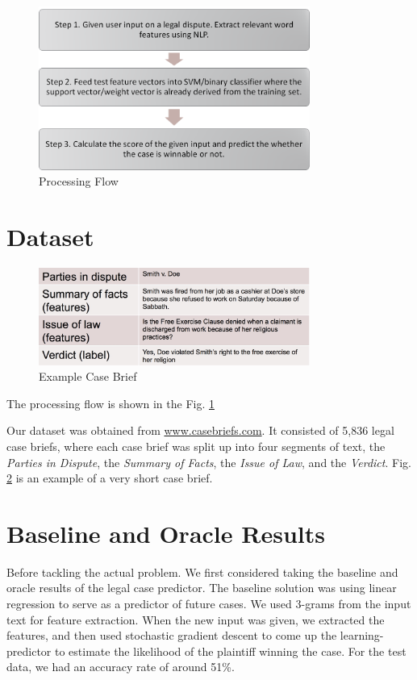 \documentclass[journal]{IEEEtran}
\begin{document}
\begin{figure}
    \centering
    \includegraphics[width=3.5in]{flow.png}
    \caption{Processing Flow}
    \label{fig:ProcessingFlow}
\end{figure}

\section{Dataset}

\begin{figure}
    \centering
    \includegraphics[width=3.5in]{exampleCaseBrief.jpg}
    \caption{Example Case Brief}
    \label{fig:ExampleCaseBrief}
\end{figure}

The processing flow is shown in the Fig. \ref{fig:ProcessingFlow}

Our dataset was obtained from \url{www.casebriefs.com}. It consisted of 5,836 legal case briefs, where each case brief was split up into four segments of text, the \textit{Parties in Dispute}, the \textit{Summary of Facts}, the \textit{Issue of Law}, and the \textit{Verdict}. Fig. \ref{fig:ExampleCaseBrief} is  an example of a very short case brief.

\section{Baseline and Oracle Results}
Before tackling the actual problem. We first considered taking the baseline and oracle results of the legal case predictor. The baseline solution was using linear regression to serve as a predictor of future cases. We used 3-grams from the input text for feature extraction.  When the new input was given, we extracted the features, and then used stochastic gradient descent to come up the learning-predictor to estimate the likelihood of the plaintiff winning the case. For the test data, we had an accuracy rate of around 51\%.
\end{document}
